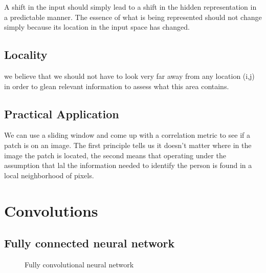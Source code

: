 \documentclass[11pt]{article}
\begin{document}
A shift in the input should simply lead to a shift in the hidden representation in a predictable manner. The essence of what is being represented should not change simply because its location in the input space has changed.

\subsection{Locality}

we believe that we should not have to look very far away from any location (i,j) in order to glean relevant information to assess what  this area contains.

\subsection{Practical Application}

We can use a sliding window and come up with a correlation metric to see if a patch is on an image. The first principle tells us it doesn't matter where in the image the patch is located, the second means that operating under the assumption that lal the information needed to identify the person is found in a local neighborhood of pixels.

\section{Convolutions}

\subsection{Fully connected neural network}

\begin{figure}[H]
    \centering
    \caption{Fully convolutional neural network}
\end{figure}
\end{document}
